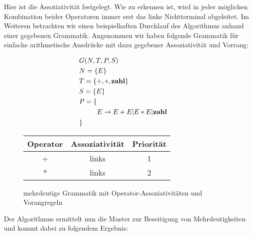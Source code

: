 \documentclass[runningheads]{llncs}
\begin{document}
	Hier ist die Assotiativität festgelegt.
	Wie zu erkennen ist, wird in jeder möglichen Kombination beider Operatoren immer erst das linke Nichtterminal abgeleitet.
	Im Weiteren betrachten wir einen beispielhaften Durchlauf des Algorithmus anhand einer gegebenen Grammatik.
	Angenommen wir haben folgende Grammatik für einfache arithmetische Ausdrücke mit dazu gegebener Assoziativität und Vorrang:

	\begin{figure}
		\begin{minipage}{0.48\textwidth}
			\begin{flushleft}
				\begin{align*}
					& G(N,T,P,S) \\
					& N = \{E\} \\
					& T = \{+, *, \bold{zahl}\} \\
					& S = \{E\} \\
					& P = \{ \begin{aligned}[t]
						         \\ E & \rightarrow E + E | E * E | \bold{zahl}
					\end{aligned} \\
					& \}
				\end{align*}
			\end{flushleft}
		\end{minipage}
		\hfill
		\begin{minipage}{0.48\textwidth}
			\begin{tabular}{|c|c|c|}
				\hline
				Operator & Assoziativität & Priorität \\
				\hline
				+            & links          & 1         \\
				*            & links          & 2         \\
				\hline
			\end{tabular}
		\end{minipage}
		\caption{mehrdeutige Grammatik mit Operator-Assoziativitäten und Vorangregeln}
		\label{fig:figure7}
	\end{figure}

	Der Algorithmus ermittelt nun die Muster zur Beseitigung von Mehrdeutigkeiten und kommt dabei zu folgendem Ergebnis:
\end{document}
